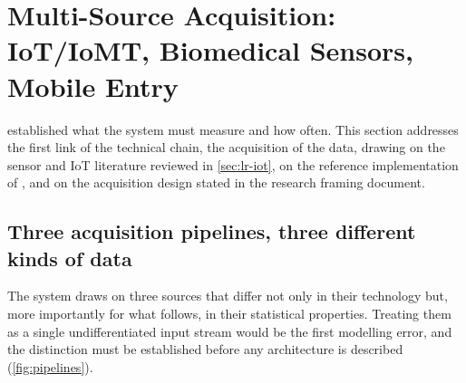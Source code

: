 \documentclass[12pt,a4paper,oneside]{report}
\begin{document}
\section{Multi-Source Acquisition: IoT/IoMT, Biomedical Sensors, Mobile Entry}\label{sec:acquisition}

 established what the system must measure and how often. This section addresses the first link of the technical chain, the acquisition of the data, drawing on the sensor and IoT literature reviewed in \cref{sec:lr-iot}, on the reference implementation of \textcite{efendi2025}, and on the acquisition design stated in the research framing document.


\subsection{Three acquisition pipelines, three different kinds of data}\label{sec:pipelines}

The system draws on three sources that differ not only in their technology but, more importantly for what follows, in their statistical properties. Treating them as a single undifferentiated input stream would be the first modelling error, and the distinction must be established before any architecture is described (\cref{fig:pipelines}).
\end{document}
